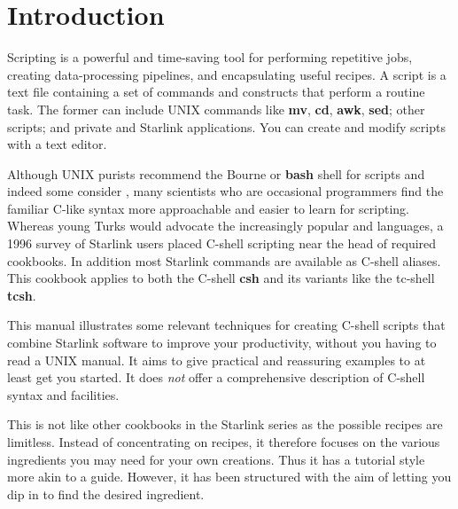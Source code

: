 \documentclass[twoside,11pt,nolof]{starlink}
\begin{document}
\scfrontmatter
\thispagestyle{empty}


\section{Introduction\label{sc4_se_intro}}

Scripting is a powerful and time-saving tool for performing repetitive
jobs, creating data-processing pipelines, and encapsulating useful
recipes.  A script is a text file containing a set of
 commands and constructs that perform
a routine task.  The former can include UNIX commands like \textbf{mv},
\textbf{cd}, \textbf{awk}, \textbf{sed}; other scripts; and private and
Starlink applications.  You can create and modify scripts with a text
editor.

Although UNIX purists recommend the Bourne or \textbf{bash} shell for
scripts and indeed some consider , many
scientists who are occasional programmers find the familiar C-like syntax
more approachable and easier to learn for scripting.  Whereas young
Turks would advocate the increasingly popular  and
 languages, a 1996
survey of Starlink users placed C-shell scripting near the head of
required cookbooks.  In addition most Starlink commands are available
as C-shell aliases.  This cookbook applies to both the C-shell {\bf
csh} and its variants like the tc-shell \textbf{tcsh}.

This manual illustrates some relevant techniques for creating C-shell
scripts that combine Starlink software to improve your productivity,
without you having to read a UNIX manual.  It aims to give practical and
reassuring examples to at least get you started.  It does \emph{not\/}
offer a comprehensive description of C-shell syntax and facilities.

This is not like other cookbooks in the Starlink series as the
possible recipes are limitless.  Instead of concentrating on recipes,
it therefore focuses on the various ingredients you may need for your
own creations.  Thus it has a tutorial style more akin to a guide.
However, it has been structured with the aim of letting you dip in to
find the desired ingredient.
\end{document}
